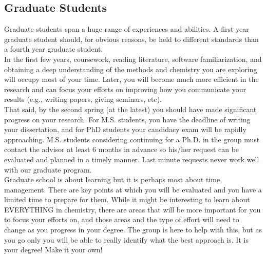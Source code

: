 \documentclass[letterpaper]{article}
\begin{document}
\subsection*{Graduate Students}
Graduate students span a huge range of experiences and abilities. A first year graduate student should, for obvious reasons, be held to different standards than a fourth year graduate student.\\

In the first few years, coursework, reading literature, software familiarization, and obtaining a deep understanding of the methods and chemistry you are exploring will occupy most of your time. Later, you will become much more efficient in the research and can focus your efforts on improving how you communicate your results (e.g., writing papers, giving seminars, etc). \\

That said, by the second spring (at the latest) you should have made significant progress on your research. For M.S. students, you have the deadline of writing your dissertation, and for PhD students your candidacy exam will be rapidly approaching. M.S. students considering continuing for a Ph.D. in the group must contact the advisor at least 6 months in advance so his/her request can be evaluated and planned in a timely manner. Last minute requests never work well with our graduate program.\\

Graduate school is about learning but it is perhaps most about time management. There are key points at which you will be evaluated and you have a limited time to prepare for them. While it might be interesting to learn about EVERYTHING in chemistry, there are areas that will be more important for you to focus your efforts on, and those areas and the type of effort will need to change as you progress in your degree. The group is here to help with this, but as you go only you will be able to really identify what the best approach is. It is your degree! Make it your own! 
\end{document}
